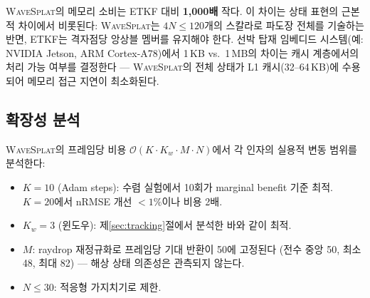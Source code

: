 \documentclass[11pt]{report}
\numberwithin{equation}{chapter}
\numberwithin{figure}{chapter}
\numberwithin{table}{chapter}
\newcommand{\WS}{\textsc{WaveSplat}}
\begin{document}
\WS{}의 메모리 소비는 ETKF 대비 \textbf{1{,}000배} 작다.
이 차이는 상태 표현의 근본적 차이에서 비롯된다:
\WS{}는 $4N \leq 120$개의 스칼라로 파도장 전체를 기술하는 반면,
ETKF는 격자점당 앙상블 멤버를 유지해야 한다.
선박 탑재 임베디드 시스템(예: NVIDIA Jetson, ARM Cortex-A78)에서
1\,KB vs.\ 1\,MB의 차이는 캐시 계층에서의 처리 가능 여부를 결정한다 ---
\WS{}의 전체 상태가 L1 캐시(32--64\,KB)에 수용되어
메모리 접근 지연이 최소화된다.

\subsection{확장성 분석}

\WS{}의 프레임당 비용 $\mathcal{O}(K \cdot K_w \cdot M \cdot N)$에서
각 인자의 실용적 변동 범위를 분석한다:
\begin{itemize}
  \item $K = 10$ (Adam steps): 수렴 실험에서 10회가 marginal benefit 기준 최적.
        $K = 20$에서 nRMSE 개선 $< 1\%$이나 비용 2배.
  \item $K_w = 3$ (윈도우): 제\ref{sec:tracking}절에서 분석한 바와 같이 최적.
  \item $M$: raydrop 재정규화로 프레임당 기대 반환이 50에 고정된다
        (전수 중앙 50, 최소 48, 최대 82) --- 해상 상태 의존성은 관측되지 않는다.
  \item $N \leq 30$: 적응형 가지치기로 제한.
\end{itemize}
\end{document}
